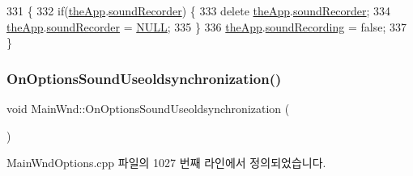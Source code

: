 \begin{DoxyCode}
331 \{
332   \textcolor{keywordflow}{if}(\mbox{\hyperlink{_v_b_a_8cpp_a8095a9d06b37a7efe3723f3218ad8fb3}{theApp}}.\mbox{\hyperlink{class_v_b_a_ae263135c638f224f26d2f2bfbd069840}{soundRecorder}}) \{
333     \textcolor{keyword}{delete} \mbox{\hyperlink{_v_b_a_8cpp_a8095a9d06b37a7efe3723f3218ad8fb3}{theApp}}.\mbox{\hyperlink{class_v_b_a_ae263135c638f224f26d2f2bfbd069840}{soundRecorder}};
334     \mbox{\hyperlink{_v_b_a_8cpp_a8095a9d06b37a7efe3723f3218ad8fb3}{theApp}}.\mbox{\hyperlink{class_v_b_a_ae263135c638f224f26d2f2bfbd069840}{soundRecorder}} = \mbox{\hyperlink{getopt1_8c_a070d2ce7b6bb7e5c05602aa8c308d0c4}{NULL}};
335   \}
336   \mbox{\hyperlink{_v_b_a_8cpp_a8095a9d06b37a7efe3723f3218ad8fb3}{theApp}}.\mbox{\hyperlink{class_v_b_a_ae4be99a1a898dc5a3fceed0edeb0c1b0}{soundRecording}} = \textcolor{keyword}{false};
337 \}
\end{DoxyCode}
\mbox{\label{class_main_wnd_a58f33cfb8f434804b45d391e7a9a9427}} 
\subsubsection{\texorpdfstring{On\+Options\+Sound\+Useoldsynchronization()}{OnOptionsSoundUseoldsynchronization()}}
{\footnotesize\ttfamily void Main\+Wnd\+::\+On\+Options\+Sound\+Useoldsynchronization (\begin{DoxyParamCaption}{ }\end{DoxyParamCaption})\hspace{0.3cm}{\ttfamily [protected]}}



Main\+Wnd\+Options.\+cpp 파일의 1027 번째 라인에서 정의되었습니다.


